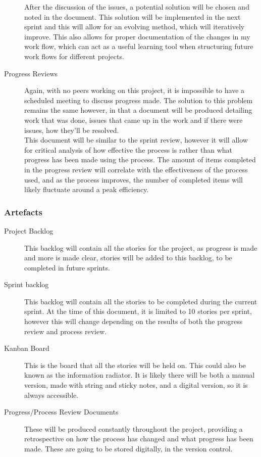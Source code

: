 \begin{description}
	After the discussion of the issues, a potential solution will be chosen and noted in the document. This solution will be implemented in the next sprint and this will allow for an evolving method, which will iteratively improve. This also allows for proper documentation of the changes in my work flow, which can act as a useful learning tool when structuring future work flows for different projects.
	
	\item[Progress Reviews]
	Again, with no peers working on this project, it is impossible to have a scheduled meeting to discuss progress made. The solution to this problem remains the same however, in that a document will be produced detailing work that was done, issues that came up in the work and if there were issues, how they'll be resolved.\\
	
	This document will be similar to the sprint review, however it will allow for critical analysis of how effective the process is rather than what progress has been made using the process. The amount of items completed in the progress review will correlate with the effectiveness of the process used, and as the process improves, the number of completed items will likely fluctuate around a peak efficiency.
	
\end{description}


\subsubsection{Artefacts}
\begin{description}
	\item[Project Backlog]
	This backlog will contain all the stories for the project, as progress is made and more is made clear, stories will be added to this backlog, to be completed in future sprints.
	
	\item[Sprint backlog]
	This backlog will contain all the stories to be completed during the current sprint. At the time of this document, it is limited to 10 stories per sprint, however this will change depending on the results of both the progress review and process review.
	
	\item[Kanban Board]
	This is the board that all the stories will be held on. This could also be known as the information radiator. It is likely there will be both a manual version, made with string and sticky notes, and a digital version, so it is always accessible.
	\item[Progress/Process Review Documents]
	These will be produced constantly throughout the project, providing a retrospective on how the process has changed and what progress has been made. These are going to be stored digitally, in the version control.
	
\end{description}
